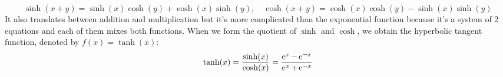 \begin{equation}
\sinh(x+y) = \sinh(x) \cosh(y) + \cosh(x) \sinh(y), \quad
\cosh(x+y) = \cosh(x) \cosh(y) - \sinh(x) \sinh(y)
\end{equation}
It also translates between addition and multiplication but it's more complicated than the exponential function because it's a system of 2 equations and each of them mixes both functions. When we form the quotient of $\sinh$ and $\cosh$, we obtain the hyperbolic tangent function, denoted by $f(x) = \tanh(x)$:
\begin{equation}
\tanh(x) =	\frac{\sinh(x)}{\cosh(x)} 
         = \frac{\operatorname{\mathrm{e}}^x - \operatorname{\mathrm{e}}^{-x}}{\operatorname{\mathrm{e}}^x + \operatorname{\mathrm{e}}^{-x}}
\end{equation}















